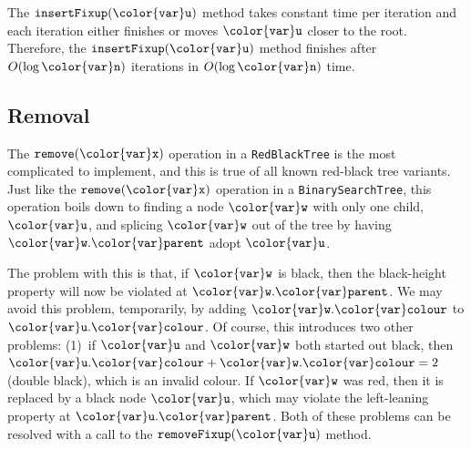 \documentclass[10pt]{book}
\theoremstyle{plain}
\theoremstyle{definition}
\begin{document}
The \ensuremath{\mathtt{insertFixup({\color{var}u})}} method takes constant time per iteration and each
iteration either finishes or moves \ensuremath{\mathtt{{\color{var}u}}} closer to the root.  Therefore,
the \ensuremath{\mathtt{insertFixup({\color{var}u})}} method finishes after $O(\log \ensuremath{\mathtt{{\color{var}n}}})$ iterations in
$O(\log \ensuremath{\mathtt{{\color{var}n}}})$ time.

\subsection{Removal}

The \ensuremath{\mathtt{remove({\color{var}x})}} operation in a \texttt{RedBlackTree} is the most complicated
to implement, and this is true of all known red-black tree variants.
Just like the \ensuremath{\mathtt{remove({\color{var}x})}} operation in a \texttt{BinarySearchTree},
this operation boils down to finding a node \ensuremath{\mathtt{{\color{var}w}}} with only one child,
\ensuremath{\mathtt{{\color{var}u}}}, and splicing \ensuremath{\mathtt{{\color{var}w}}} out of the tree by having \ensuremath{\mathtt{{\color{var}w}.{\color{var}parent}}} adopt \ensuremath{\mathtt{{\color{var}u}}}.

The problem with this is that, if \ensuremath{\mathtt{{\color{var}w}}} is black, then the black-height
property will now be violated at \ensuremath{\mathtt{{\color{var}w}.{\color{var}parent}}}.  We may avoid this problem,
temporarily, by adding \ensuremath{\mathtt{{\color{var}w}.{\color{var}colour}}} to \ensuremath{\mathtt{{\color{var}u}.{\color{var}colour}}}.  Of course, this introduces
two other problems:  (1)~if \ensuremath{\mathtt{{\color{var}u}}} and \ensuremath{\mathtt{{\color{var}w}}} both started out black, then
$\ensuremath{\mathtt{{\color{var}u}.{\color{var}colour}}}+\ensuremath{\mathtt{{\color{var}w}.{\color{var}colour}}}=2$ (double black), which is an invalid colour.
If \ensuremath{\mathtt{{\color{var}w}}} was red, then it is replaced by a black node \ensuremath{\mathtt{{\color{var}u}}}, which may
violate the left-leaning property at $\ensuremath{\mathtt{{\color{var}u}.{\color{var}parent}}}$.  Both of these
problems can be resolved with a call to the \ensuremath{\mathtt{removeFixup({\color{var}u})}} method.
\end{document}
